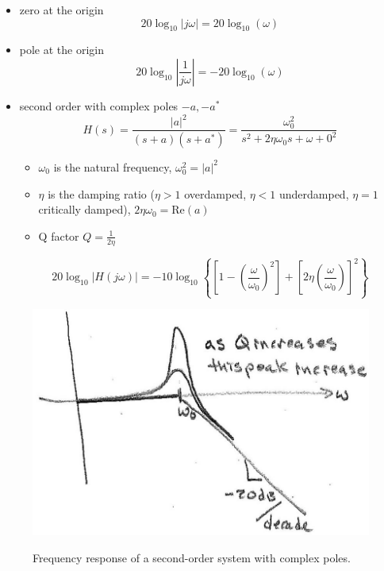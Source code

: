 \documentclass{article}
\begin{document}
\begin{itemize}
\item zero at the origin
  \[
  20\log_{10}|j\omega| = 20\log_{10}(\omega)
  \]
\item pole at the origin
  \[
  20\log_{10}\left|\frac{1}{j\omega}\right| = -20\log_{10}(\omega)
  \]
\item second order with complex poles $-a, -a^*$
  \[
  H(s) = \frac{|a|^2}{(s+a)(s+a^*)} = \frac{\omega_0^2}{s^2 + 2\eta\omega_0 s + \omega+0^2}
  \]
  \begin{itemize}
  \item $\omega_0$ is the natural frequency, $\omega_0^2 = |a|^2$
  \item $\eta$ is the damping ratio ($\eta > 1$ overdamped, $\eta < 1$ underdamped, $\eta = 1$ critically damped), $2\eta\omega_0 = \text{Re}(a)$
  \item Q factor $Q=\frac{1}{2\eta}$
  \end{itemize}

  \[
  20\log_{10}|H(j\omega)| = -10\log_{10}\left\{ \left[1-\left(\frac{\omega}{\omega_0}\right)^2\right] + \left[2\eta \left(\frac{\omega}{\omega_0}\right)\right]^2\right\}
  \]
\end{itemize}

\begin{figure}
  \centering
  \includegraphics[alt={illustration of second order frequency response.}]{images/fig14_6.png}
  \caption{Frequency response of a second-order system with complex poles.}
\end{figure}
\end{document}
